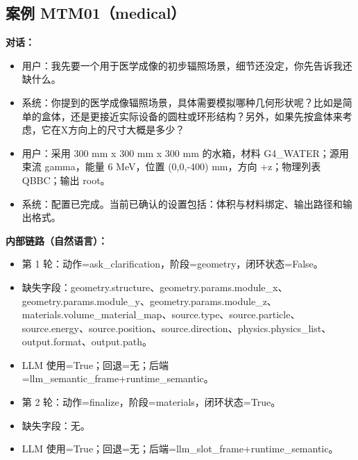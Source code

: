 \documentclass[11pt]{ctexart}
\begin{document}
\subsection{案例 MTM01（medical）}
\textbf{对话：}
\begin{itemize}
\item 用户：我先要一个用于医学成像的初步辐照场景，细节还没定，你先告诉我还缺什么。
\item 系统：你提到的医学成像辐照场景，具体需要模拟哪种几何形状呢？比如是简单的盒体，还是更接近实际设备的圆柱或环形结构？另外，如果先按盒体来考虑，它在X方向上的尺寸大概是多少？
\item 用户：采用 300 mm x 300 mm x 300 mm 的水箱，材料 G4\_WATER；源用束流 gamma，能量 6 MeV，位置 (0,0,-400) mm，方向 +z；物理列表 QBBC；输出 root。
\item 系统：配置已完成。当前已确认的设置包括：体积与材料绑定、输出路径和输出格式。
\end{itemize}
\textbf{内部链路（自然语言）：}
\begin{itemize}
\item 第 1 轮：动作=ask\_clarification，阶段=geometry，闭环状态=False。
\item 缺失字段：geometry.structure、geometry.params.module\_x、geometry.params.module\_y、geometry.params.module\_z、materials.volume\_material\_map、source.type、source.particle、source.energy、source.position、source.direction、physics.physics\_list、output.format、output.path。
\item LLM 使用=True；回退=无；后端=llm\_semantic\_frame+runtime\_semantic。
\item 第 2 轮：动作=finalize，阶段=materials，闭环状态=True。
\item 缺失字段：无。
\item LLM 使用=True；回退=无；后端=llm\_slot\_frame+runtime\_semantic。
\end{itemize}
\end{document}
